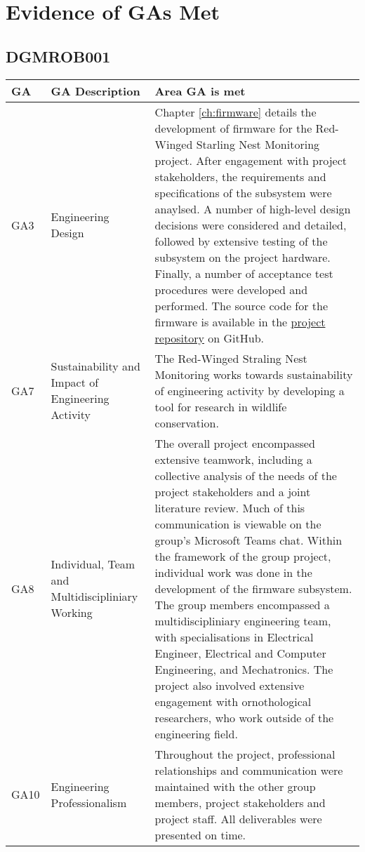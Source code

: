\documentclass[class=report,11pt,crop=false]{standalone}
\begin{document}
\ifstandalone
\tableofcontents
\fi


\chapter{Evidence of GAs Met}

\section{DGMROB001}

\centering
\begin{tabularx}{\textwidth}{|p{} p{} X|}

    \hline
    \textbf{GA} & \textbf{GA Description} & \textbf{Area GA is met} \\ \hline

    GA3 & Engineering Design & Chapter \ref{ch:firmware} details the development of firmware for the Red-Winged Starling Nest Monitoring project. After engagement with project stakeholders, the requirements and specifications of the subsystem were anaylsed. A number of high-level design decisions were considered and detailed, followed by extensive testing of the subsystem on the project hardware. Finally, a number of acceptance test procedures were developed and performed. The source code for the firmware is available in the \href{https://github.com/rothdu/EEE4113F-Group13-2024}{project repository} on GitHub. \\ \hline

    GA7 & Sustainability and Impact of Engineering Activity & The Red-Winged Straling Nest Monitoring works towards sustainability of engineering activity by developing a tool for research in wildlife conservation. \\ \hline

    GA8 & Individual, Team and Multidiscipliniary Working & The overall project encompassed extensive teamwork, including a collective analysis of the needs of the project stakeholders and a joint literature review. Much of this communication is viewable on the group's Microsoft Teams chat. Within the framework of the group project, individual work was done in the development of the firmware subsystem. The group members encompassed a multidiscipliniary engineering team, with specialisations in Electrical Engineer, Electrical and Computer Engineering, and Mechatronics. The project also involved extensive engagement with ornothological researchers, who work outside of the engineering field. \\ \hline

    GA10 & Engineering Professionalism & Throughout the project, professional relationships and communication were maintained with the other group members, project stakeholders and project staff. All deliverables were presented on time. \\ \hline


\end{tabularx}
\raggedright
\end{document}
